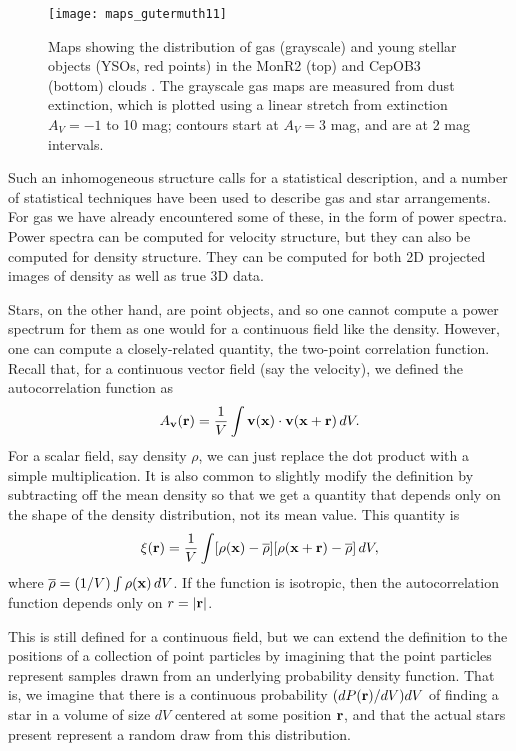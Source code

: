 \begin{figure}
\texttt{[image: maps\_gutermuth11]}
\caption[Maps of gas and young stars in two clouds]{
\label{fig:maps_gutermuth11}
Maps showing the distribution of gas (grayscale) and young stellar objects (YSOs, red points) in the MonR2 (top) and CepOB3 (bottom) clouds \citep{gutermuth11a}. The grayscale gas maps are measured from dust extinction, which is plotted using a linear stretch from extinction $A_V = -1$ to 10 mag; contours start at $A_V=3$ mag, and are at 2 mag intervals.
}
\end{figure}

Such an inhomogeneous structure calls for a statistical description, and a number of statistical techniques have been used to describe gas and star arrangements. For gas we have already encountered some of these, in the form of power spectra. Power spectra can be computed for velocity structure, but they can also be computed for density structure. They can be computed for both 2D projected images of density as well as true 3D data.

Stars, on the other hand, are point objects, and so one cannot compute a power spectrum for them as one would for a continuous field like the density. However, one can compute a closely-related quantity, the two-point correlation function. Recall that, for a continuous vector field (say the velocity), we defined the autocorrelation function as
\begin{equation}
A_{\mathbf{v}}(\mathbf{r}) = \frac{1}{V} \int \mathbf{v}(\mathbf{x}) \cdot \mathbf{v}(\mathbf{x} + \mathbf{r})\, dV.
\end{equation}
For a scalar field, say density $\rho$, we can just replace the dot product with a simple multiplication. It is also common to slightly modify the definition by subtracting off the mean density so that we get a quantity that depends only on the shape of the density distribution, not its mean value. This quantity is
\begin{equation}
\label{eq:autocorr}
\xi(\vecr) = \frac{1}{V} \int [\rho(\vecx)-\overline{\rho}] [\rho(\vecx + \vecr)-\overline{\rho}]\, dV,
\end{equation}
where $\overline{\rho} = (1/V) \int \rho(\mathbf{x})\, dV$. If the function is isotropic, then the autocorrelation function depends only on $r=|\mathbf{r}|$.

This is still defined for a continuous field, but we can extend the definition to the positions of a collection of point particles by imagining that the point particles represent samples drawn from an underlying probability density function. That is, we imagine that there is a continuous probability $(dP(\mathbf{r})/dV) dV$ of finding a star in a volume of size $dV$ centered at some position $\mathbf{r}$, and that the actual stars present represent a random draw from this distribution.

